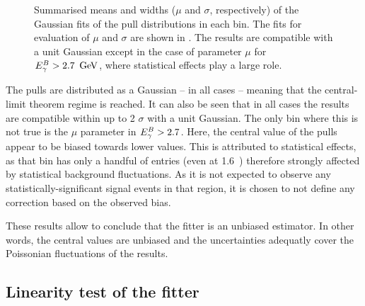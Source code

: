 \begin{figure}[htbp!]
    \centering
    \caption{\label{fig:mean_sigma_pulls}Summarised means and widths ($\mu$ and $\sigma$, respectively) of the Gaussian fits of
    the pull distributions in each \EB bin.
    The fits for evaluation of $\mu$ and $\sigma$ are shown in .
    The results are compatible with a unit Gaussian except in the case of parameter $\mu$ for ${E^B_{\gamma}}>2.7~\mathrm{\,Ge\kern -0.1em V}$, where statistical effects play a large role.
    }
\end{figure}

The pulls are distributed as a Gaussian -- in all cases -- meaning that the central-limit theorem regime is reached.
It can also be seen that in all cases the results are compatible within up to 2 $\sigma$ with a unit Gaussian.
The only \EB bin where this is not true is the $\mu$ parameter in ${E^B_{\gamma}}>2.7$.
Here, the central value of the pulls appear to be biased towards lower values.
This is attributed to statistical effects, as that bin has only a handful of entries (even at 1.6~\invab) therefore strongly affected by statistical background fluctuations.
As it is not expected to observe any statistically-significant signal events in that region, it is chosen to not define any correction based on the observed bias.

These results allow to conclude that the \Mbc fitter is an unbiased estimator.
In other words, the central values are unbiased and the uncertainties adequatly cover the Poissonian fluctuations of the results.

\subsection{Linearity test of the \texorpdfstring{\Mbc}{Mbc} fitter}\label{sec:linearity_test}


